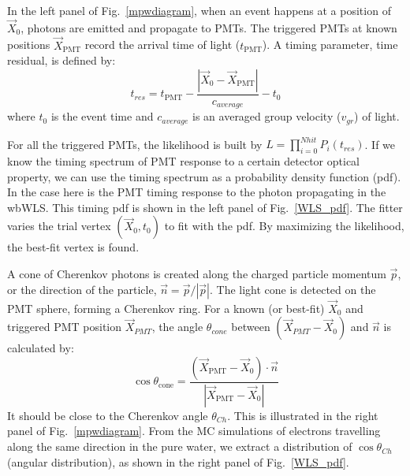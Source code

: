 \documentclass[preprint,12pt]{elsarticle}
\numberwithin{equation}{section}
\begin{document}
In the left panel of Fig.~\ref{mpwdiagram}, when an event happens at a position of $\vec{X}_{0}$, photons are emitted and propagate to PMTs. The triggered PMTs at known positions $\vec{X}_\mathrm{PMT}$ record the arrival time of light ($t_\mathrm{PMT}$). A timing parameter, time residual, is defined by: 
\begin{equation}
t_{res} = t_\mathrm{PMT}-\frac{|\vec{X}_{0}-\vec{X}_\mathrm{PMT}|}{c_{average}}-t_0
\end{equation}
where $t_0$ is the event time and $c_{average}$ is an averaged group velocity ($v_{gr}$) of light.

For all the triggered PMTs, the likelihood is built by $L=\prod^{Nhit}_{i=0}P_i(t_{res})$. If we know the timing spectrum of PMT response to a certain detector optical property, we can use the timing spectrum as a probability density function (pdf). In the case here is the PMT timing response to the photon propagating in the wbWLS. This timing pdf is shown in the left panel of Fig.~\ref{WLS_pdf}.
The fitter varies the trial vertex $(\vec{X}_{0},t_0)$ to fit with the pdf. By maximizing the likelihood, the best-fit vertex is found.

A cone of Cherenkov photons is created along the charged particle momentum $\vec{p}$, or the direction of the particle, $\vec n = \vec p/|\vec p|$. The light cone is detected on the PMT sphere, forming a Cherenkov ring. For a known (or best-fit) $\vec{X}_{0}$ and triggered PMT position $\vec{X}_{PMT}$, the angle $\theta_{cone}$ between $(\vec{X}_{PMT}-\vec{X}_{0})$ and $\vec n$ is calculated by:
\[\cos\theta_\mathrm{cone} = \frac{(\vec{X}_\mathrm{PMT}-\vec{X}_{0})\cdot \vec{n}}{|\vec{X}_\mathrm{PMT}-\vec{X}_{0}|}\]
It should be close to the Cherenkov angle $\theta_{Ch}$. This is illustrated in the right panel of Fig.~\ref{mpwdiagram}. From the MC simulations of electrons travelling along the same direction in the pure water, we extract a distribution of $\cos\theta_{Ch}$ (angular distribution), as shown in the right panel of Fig.~\ref{WLS_pdf}. 
\end{document}
